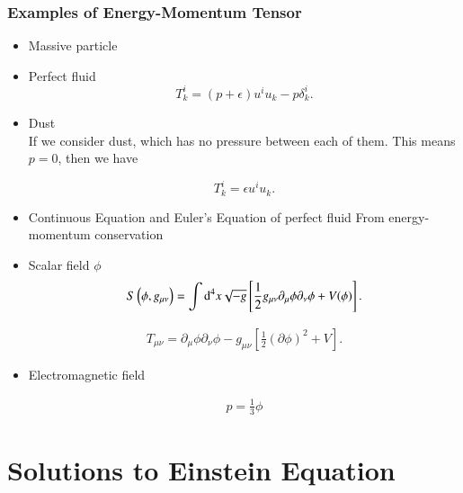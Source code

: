\documentclass[openany,10pt]{book}
\theoremstyle{definition}
\theoremstyle{definition}
\theoremstyle{remark}
\newcommand{\be}{\begin{eqnarray}}
\newcommand{\ee}{\end{eqnarray}}
\begin{document}
\subsection{Examples of Energy-Momentum Tensor}
\begin{itemize}
    \item Massive particle\\


\item Perfect fluid\\
\begin{equation}
    T^i_k=(p+\epsilon)u^iu_k-p\delta^i_k.
\end{equation}

\item Dust\\
If we consider dust, which has no pressure between each of them. This means $p=0$, then we have 

\begin{equation}
    T^i_k=\epsilon u^iu_k.
\end{equation}



\item Continuous Equation and Euler's Equation of perfect fluid
From energy-momentum conservation\\

\item Scalar field $\phi$\\
\be
S\left(\phi,g_{\mu\nu}\right)=\int {\rm d}^4x\sqrt{-g}\left[\frac12g_{\mu\nu}\partial_\mu\phi\partial_\nu\phi+V(\phi)\right].
\ee


\be
T_{\mu\nu}= \partial_{\mu}\phi\partial_\nu\phi-g_{\mu\nu}\left[\frac12\left(\partial\phi\right)^2+V\right].
\ee

\item Electromagnetic field

\be
p=\frac13\phi
\ee
\end{itemize}



\chapter{Solutions to Einstein Equation}
\end{document}
